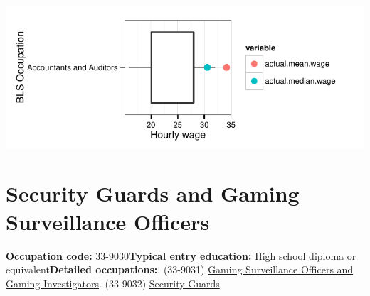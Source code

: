 \documentclass[a4paper,10pt]{article}\usepackage[]{graphicx}\usepackage[]{color}
\makeatletter
\def\maxwidth{ %
  \ifdim\Gin@nat@width>\linewidth
    \linewidth
  \else
    \Gin@nat@width
  \fi
}
\makeatother
\begin{document}
{\centering \includegraphics[width=\maxwidth]{figure/unnamed-chunk-226} 

}


\newpage\section{Security Guards and Gaming Surveillance Officers}\textbf{Occupation code:} 33-9030\newline\textbf{Typical entry education:} High school diploma or equivalent\newline\textbf{Detailed occupations:}. (33-9031)  \href{http://www.bls.gov/oes/current/oes339031.htm}{Gaming Surveillance Officers and Gaming Investigators}. (33-9032)  \href{http://www.bls.gov/oes/current/oes339032.htm}{Security Guards}\newline%
\end{document}
